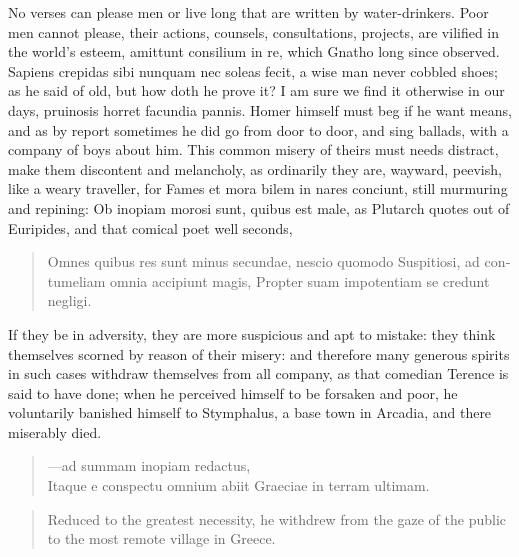 {{No verses can please men or live long that are written by
water-drinkers. Poor men cannot please, their actions, counsels,
consultations, projects, are vilified in the world's esteem, amittunt
consilium in re, which Gnatho long since observed. Sapiens
crepidas sibi nunquam nec soleas fecit, a wise man never cobbled shoes;
as he said of old, but how doth he prove it? I am sure we find it
otherwise in our days,  pruinosis horret facundia pannis. Homer
himself must beg if he want means, and as by report sometimes he did
go from door to door, and sing ballads, with a company of boys
about him. This common misery of theirs must needs distract, make them
discontent and melancholy, as ordinarily they are, wayward, peevish,
like a weary traveller, for  Fames et mora bilem in nares
conciunt, still murmuring and repining: Ob inopiam morosi sunt, quibus
est male, as Plutarch quotes out of Euripides, and that comical poet
well seconds,

\begin{latin}
\begin{quote}
Omnes quibus res sunt minus secundae, nescio quomodo
Suspitiosi, ad contumeliam omnia accipiunt magis,
Propter suam impotentiam se credunt negligi.
\end{quote}
\end{latin}

If they be in adversity, they are more suspicious and apt to mistake:
they think themselves scorned by reason of their misery: and therefore
many generous spirits in such cases withdraw themselves from all
company, as that comedian Terence is said to have done; when he
perceived himself to be forsaken and poor, he voluntarily banished
himself to Stymphalus, a base town in Arcadia, and there miserably
died.
%
\begin{latin}
\begin{quote}
---ad summam inopiam redactus,\\
Itaque e conspectu omnium abiit Graeciae in terram ultimam.
\end{quote}
\end{latin}
\translationrule
\begin{quote}%
Reduced to the greatest necessity, he withdrew from the gaze of the public to the most remote village in Greece.
\end{quote}

}}

